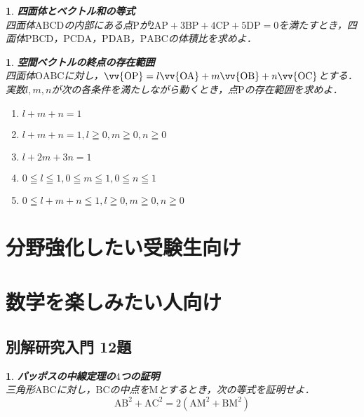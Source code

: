 \documentclass[10pt,
fleqn,
dvipdfmx,
uplatex
]{jsarticle}
\newtheorem{question}[Question]{}
\begin{document}
\begin{question}{\bf\boldmath 四面体とベクトル和の等式}\\
四面体$\text{ABCD}$の内部にある点$\text{P}$が$2\text{AP}+3\text{BP}+4\text{CP}+5\text{DP}=0$を満たすとき，四面体$\text{PBCD}$，$\text{PCDA}$，$\text{PDAB}$，$\text{PABC}$の体積比を求めよ．
\end{question}



\begin{question}{\bf\boldmath 空間ベクトルの終点の存在範囲}\\
四面体$\text{OABC}$に対し，$\vv {\text{OP}}=l\vv {\text{OA}}+m\vv {\text{OB}}+n\vv {\text{OC}}$とする．実数$l, m, n$が次の各条件を満たしながら動くとき，点$\text{P}$の存在範囲を求めよ．
\begin{enumerate}
\item $l+m+n=1$
\item $l+m+n=1, l\geqq 0, m\geqq 0, n\geqq 0$
\item $l+2m+3n=1$
\item $0\leqq l\leqq 1, 0\leqq m\leqq 1, 0\leqq n\leqq 1$
\item $0\leqq l+m+n\leqq 1, l\geqq 0, m\geqq 0, n\geqq 0$
\end{enumerate}

\end{question}

\section{分野強化したい受験生向け}

\section{数学を楽しみたい人向け}

\subsection{別解研究入門 12題}



\begin{question}{\bf\boldmath パッポスの中線定理の$4$つの証明}\\
三角形$\text{ABC}$に対し，$\text{BC}$の中点を$\text{M}$とするとき，次の等式を証明せよ．
\[\text{AB}^2+\text{AC}^2=2\left(\text{AM}^2+\text{BM}^2\right)\]
\end{question}
\end{document}
